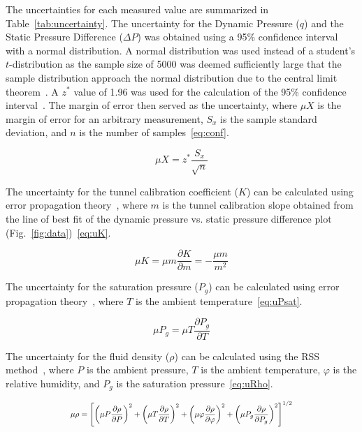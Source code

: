 \documentclass[journal,letterpaper]{IEEEtran}
\begin{document}
The uncertainties for each measured value are summarized in Table~\ref{tab:uncertainty}.
The uncertainty for the Dynamic Pressure ($q$) and the Static Pressure Difference ($\Delta P$) was obtained using a 95\% confidence interval with a normal distribution.
A normal distribution was used instead of a student's $t$-distribution as the sample size of 5000 was deemed sufficiently large that the sample distribution approach the normal distribution due to the central limit theorem~\cite{MoMLecture}.
A $z^*$ value of 1.96 was used for the calculation of the 95\% confidence interval~\cite{MoMLecture}.
The margin of error then served as the uncertainty, where $\mu X$ is the margin of error for an arbitrary measurement, $S_x$ is the sample standard deviation, and $n$ is the number of samples~\eqref{eq:conf}.

\begin{equation} \label{eq:conf}
    \mu X = z^* \frac{S_x}{\sqrt{n}}
\end{equation}

The uncertainty for the tunnel calibration coefficient ($K$) can be calculated using error propagation theory~\cite{errorprop}, where $m$ is the tunnel calibration slope obtained from the line of best fit of the dynamic pressure vs. static pressure difference plot (Fig.~\ref{fig:data})~\eqref{eq:uK}.

\begin{equation} \label{eq:uK}
    \mu K = \mu m \frac{\partial K}{\partial m} = -\frac{\mu m}{m^2}
\end{equation}

The uncertainty for the saturation pressure ($P_g$) can be calculated using error propagation theory~\cite{errorprop}, where $T$ is the ambient temperature~\eqref{eq:uPsat}.

\begin{equation} \label{eq:uPsat}
    \mu P_g = \mu T \frac{\partial P_g}{\partial T}
\end{equation}

The uncertainty for the fluid density ($\rho$) can be calculated using the RSS method~\cite{MoMLecture}, where $P$ is the ambient pressure, $T$ is the ambient temperature, $\varphi$ is the relative humidity, and $P_g$ is the saturation pressure~\eqref{eq:uRho}.

\begin{equation} \label{eq:uRho}
    \resizebox{227pt}{!}{$\displaystyle{\mu \rho = \left[\left(\mu P \frac{\partial \rho}{\partial P}\right)^2 + \left(\mu T \frac{\partial \rho}{\partial T}\right)^2 + \left(\mu \varphi \frac{\partial \rho}{\partial \varphi}\right)^2 + \left(\mu P_g \frac{\partial \rho}{\partial P_g}\right)^2\right]^{1/2}}$}
\end{equation}
\end{document}
